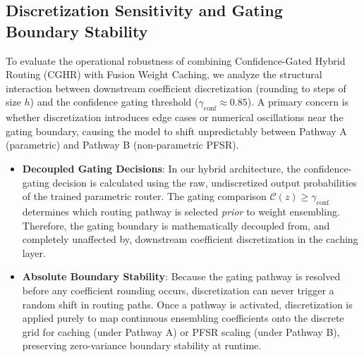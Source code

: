 \documentclass{article}
\theoremstyle{plain}
\theoremstyle{definition}
\theoremstyle{remark}
\begin{document}
\subsection{Discretization Sensitivity and Gating Boundary Stability}
To evaluate the operational robustness of combining Confidence-Gated Hybrid Routing (CGHR) with Fusion Weight Caching, we analyze the structural interaction between downstream coefficient discretization (rounding to steps of size $h$) and the confidence gating threshold ($\gamma_{\text{conf}} \approx 0.85$). A primary concern is whether discretization introduces edge cases or numerical oscillations near the gating boundary, causing the model to shift unpredictably between Pathway A (parametric) and Pathway B (non-parametric PFSR).
\begin{itemize}
    \item \textbf{Decoupled Gating Decisions}: In our hybrid architecture, the confidence-gating decision is calculated using the raw, undiscretized output probabilities of the trained parametric router. The gating comparison $\mathcal{C}(z) \ge \gamma_{\text{conf}}$ determines which routing pathway is selected \emph{prior} to weight ensembling. Therefore, the gating boundary is mathematically decoupled from, and completely unaffected by, downstream coefficient discretization in the caching layer.
    \item \textbf{Absolute Boundary Stability}: Because the gating pathway is resolved before any coefficient rounding occurs, discretization can never trigger a random shift in routing paths. Once a pathway is activated, discretization is applied purely to map continuous ensembling coefficients onto the discrete grid for caching (under Pathway A) or PFSR scaling (under Pathway B), preserving zero-variance boundary stability at runtime.
\end{itemize}
\end{document}
